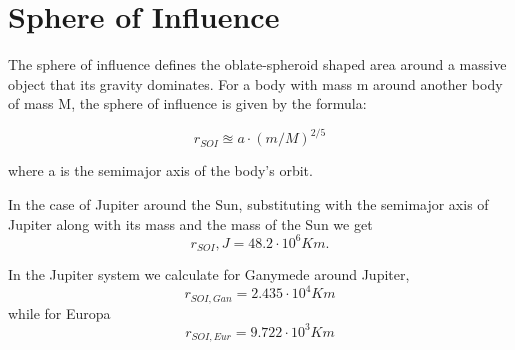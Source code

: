 \chapter{Sphere of Influence}\label{app:sphere_of_infl}  
The sphere of influence defines the oblate-spheroid shaped area around a massive object that its gravity dominates. For a body with mass m around another body of mass M, the sphere of influence is given by the formula:

\begin{equation}
r_{SOI} \approxeq a\cdot (m/M)^{2/5}
\end{equation}

where a is the semimajor axis of the body's orbit.

In the case of Jupiter around the Sun, substituting with the semimajor axis of Jupiter along with its mass and the mass of the Sun we get 
\begin{equation}
r_{SOI},J=48.2\cdot 10^6 Km.     
\end{equation}

In the Jupiter system we calculate for Ganymede around Jupiter,
\begin{equation}
r_{SOI,Gan}=2.435\cdot 10^4 Km    
\end{equation}
while for Europa 
\begin{equation}
r_{SOI,Eur}=9.722\cdot 10^3 Km    
\end{equation}
 